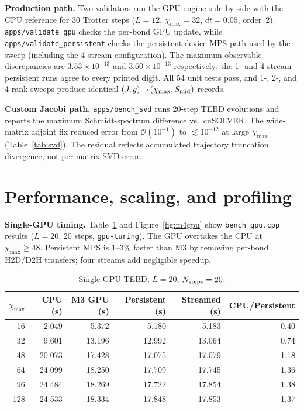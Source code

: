 \documentclass[11pt]{article}
\newcommand{\code}[1]{\texttt{#1}}
\begin{document}
\textbf{Production path.}
Two validators run the GPU engine side-by-side with the CPU reference for
30 Trotter steps ($L{=}12$, $\chi_{\max}{=}32$, $dt{=}0.05$, order~2).
\code{apps/validate\_gpu} checks the per-bond GPU update, while
\code{apps/validate\_persistent} checks the persistent device-MPS path used by
the sweep (including the 4-stream configuration).  The maximum observable
discrepancies are $3.53\times10^{-13}$ and $3.60\times10^{-13}$ respectively;
the 1- and 4-stream persistent runs agree to every printed digit.  All 54 unit
tests pass, and 1-, 2-, and 4-rank sweeps produce identical
$(J,g)\!\to\!(\chi_{\max},S_{\rm mid})$ records.

\textbf{Custom Jacobi path.}
\code{apps/bench\_svd} runs 20-step TEBD evolutions and reports the maximum
Schmidt-spectrum difference vs.\ cuSOLVER.  The wide-matrix adjoint fix
reduced error from $\mathcal{O}(10^{-1})$ to $\lesssim10^{-12}$ at large
$\chi_{\max}$ (Table~\ref{tab:svd}).  The residual reflects accumulated
trajectory truncation divergence, not per-matrix SVD error.

\section{Performance, scaling, and profiling}

\textbf{Single-GPU timing.}
Table~\ref{tab:gpu} and Figure~\ref{fig:m4gpu} show
\code{bench\_gpu.cpp} results ($L=20$, 20 steps, \code{gpu-turing}).
The GPU overtakes the CPU at $\chi_{\max}\ge48$.  Persistent MPS is 1--3\%
faster than M3 by removing per-bond H2D/D2H transfers; four streams add
negligible speedup.

\begin{table}[h]\centering\small
\begin{tabular}{rrrrrr}
\toprule
$\chi_{\max}$ & CPU (s) & M3 GPU (s) & Persistent (s) & Streamed (s) & CPU/Persistent \\
\midrule
16  & 2.049 & 5.372 & 5.180 & 5.183 & 0.40 \\
32  & 9.601 & 13.196 & 12.992 & 13.064 & 0.74 \\
48  & 20.073 & 17.428 & 17.075 & 17.079 & 1.18 \\
64  & 24.099 & 18.250 & 17.709 & 17.745 & 1.36 \\
96  & 24.484 & 18.269 & 17.722 & 17.854 & 1.38 \\
128 & 24.533 & 18.334 & 17.848 & 17.853 & 1.37 \\
\bottomrule
\end{tabular}
\caption{Single-GPU TEBD, $L=20$, $N_{\rm steps}=20$.}
\label{tab:gpu}
\end{table}
\end{document}
